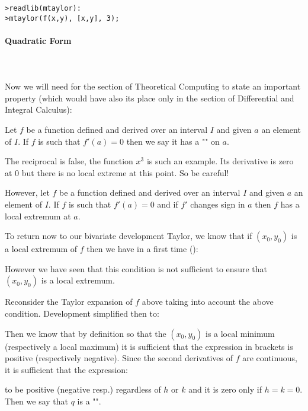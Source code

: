 	\texttt{>readlib(mtaylor):\\
	>mtaylor(f(x,y), [x,y], 3);}
	
	\paragraph{Quadratic Form}\mbox{}\\\\
	Now we will need for the section of Theoretical Computing to state an important property (which would have also its place only in the section of Differential and Integral Calculus):
	
	Let $f$ be a function defined and derived over an interval $I$ and given $a$ an element of $I$. If $f$ is such that $f'(a)=0$ then we say it has a "\label{local extremum}" on $a$.
	
	\begin{tcolorbox}[title=Remark,colframe=black,arc=10pt]
	The reciprocal is false, the function $x^3$ is such an example. Its derivative is zero at $0$ but there is no local extreme at this point. So be careful!
	\end{tcolorbox}
	
	However, let $f$ be a function defined and derived over an interval $I$ and given $a$ an element of $I$. If $f$ is such that $f'(a)=0$ and if $f'$ changes sign in $a$ then $f$ has a local extremum at $a$.
	
	To return now to our bivariate development Taylor, we know that if $(x_0,y_0)$ is a local extremum of $f$ then we have in a first time ():
	
	However we have seen that this condition is not sufficient to ensure that $(x_0,y_0)$ is a local extremum.
	
	Reconsider the Taylor expansion of $f$ above taking into account the above condition. Development simplified then to:
	
	Then we know that by definition so that the $(x_0,y_0)$ is a local minimum (respectively a local maximum) it is sufficient that the expression in brackets is positive (respectively negative). Since the second derivatives of $f$ are continuous, it is sufficient that the expression:
	
	to be positive (negative resp.) regardless of $h$ or $k$ and it is zero only if $h=k=0$. Then we say that $q$ is a "".
	
